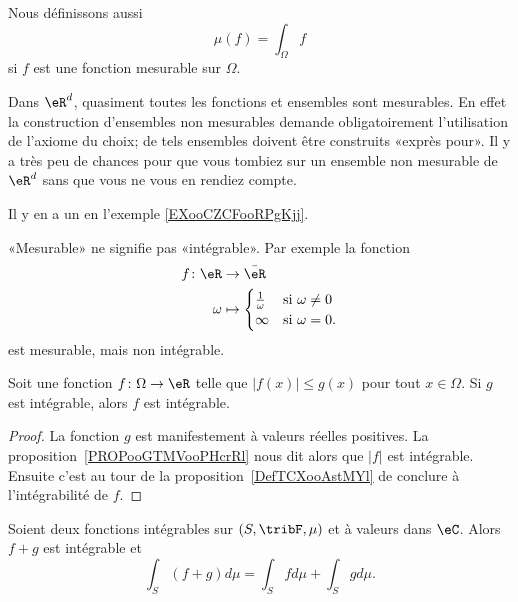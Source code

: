 Nous définissons aussi
\begin{equation}
    \mu(f)=\int_{\Omega}f
\end{equation}
si \( f\) est une fonction mesurable sur \( \Omega\).

\begin{remark}
    Dans \( \eR^d\), quasiment toutes les fonctions et ensembles sont mesurables. En effet la construction d'ensembles non mesurables demande obligatoirement l'utilisation de l'axiome du choix; de tels ensembles doivent être construits «exprès pour». Il y a très peu de chances pour que vous tombiez sur un ensemble non mesurable de \( \eR^d\) sans que vous ne vous en rendiez compte.

    Il y en a un en l'exemple \ref{EXooCZCFooRPgKjj}.
\end{remark}

\begin{remark}
    «Mesurable» ne signifie pas «intégrable». Par exemple la fonction
    \begin{equation}
        \begin{aligned}
            f\colon \eR&\to \bar\eR \\
            \omega&\mapsto\begin{cases}
            \frac{1}{ \omega }    &   \text{si } \omega\neq 0\\
            \infty    &    \text{si }\omega=0.
            \end{cases}
        \end{aligned}
    \end{equation}
    est mesurable, mais non intégrable.
\end{remark}

\begin{lemma}   \label{LemPfHgal}
    Soit une fonction \( f\colon \Omega\to \eR\) telle que \( | f(x)|\leq g(x) \) pour tout \( x\in\Omega\). Si \( g\) est intégrable, alors \( f\) est intégrable.
\end{lemma}

\begin{proof}
    La fonction \( g\) est manifestement à valeurs réelles positives. La proposition~\ref{PROPooGTMVooPHcrRl} nous dit alors que \( | f |\) est intégrable. Ensuite c'est au tour de la proposition~\ref{DefTCXooAstMYl} de conclure à l'intégrabilité de \( f\).
\end{proof}

\begin{proposition}     \label{PROPooFIYEooCpdmwZ}
    Soient deux fonctions intégrables sur \( (S,\tribF,\mu)\) et à valeurs dans \( \eC\). Alors \( f+g\) est intégrable et
    \begin{equation}
        \int_S(f+g)d\mu=\int_Sfd\mu+\int_Sgd\mu.
    \end{equation}
\end{proposition}

